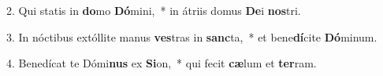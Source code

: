 2. Qui statis in \textbf{do}mo \textbf{Dó}mini,~*  in átriis domus \textbf{De}i \textbf{nos}tri.\

3. In nóctibus extóllite manus \textbf{ves}tras in \textbf{sanc}ta,~*  et bene\textbf{dí}cite \textbf{Dó}minum.\

4. Benedícat te Dómi\textbf{nus} ex \textbf{Si}on,~*  qui fecit \textbf{cæ}lum et \textbf{ter}ram.\

